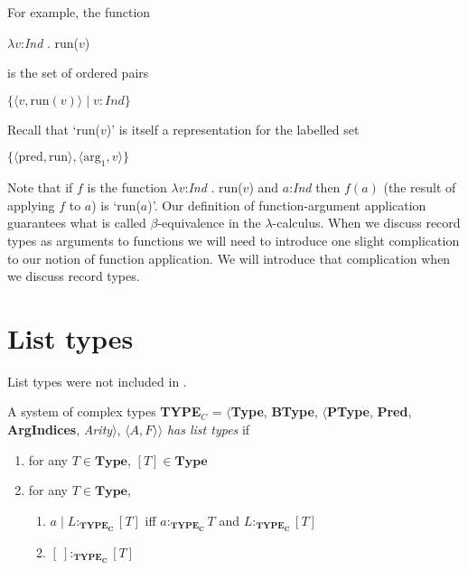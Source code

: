 For
example, the function

$\lambda v$:\textit{Ind} . run($v$)

is the set of ordered pairs

$\{\langle v,\mathrm{run}(v)\rangle\mid v:\mathit{Ind}\}$

Recall that `run($v$)' is itself a representation for the labelled
set

$\{\langle \mathrm{pred},\mathrm{run}\rangle, \langle
\mathrm{arg}_1,v\rangle\}$

Note that if $f$ is the function $\lambda v$:\textit{Ind} . run($v$)
and $a$:\textit{Ind} then $f(a)$ (the result of applying $f$ to $a$)
is `run($a$)'.  Our definition of function-argument application
guarantees what is called $\beta$-equivalence in the
$\lambda$-calculus.  When we discuss record types as arguments to
functions we will need to introduce one slight complication to our
notion of function application.  We will introduce that complication
when we discuss record types.


\section{List types}
\label{app:listtypes}

List types were not included in \cite{Cooper2012}.

A system of complex types {\bf TYPE$_C$} = $\langle${\bf Type}, {\bf BType},
$\langle$\textbf{PType}, {\bf Pred}, \textbf{ArgIndices}, {\it Arity\/}$\rangle$, $\langle A,F\rangle$$\rangle$ \textit{has list types} if
\begin{enumerate} 
 
\item for any $T \in \textbf{Type}$, $[T] \in \textbf{Type}$ 
 
\item for any $T \in \textbf{Type}$, 
\begin{enumerate} 
 
\item $a\mid L:_{\mathbf{TYPE_C}}[T]$ iff
  $a:_{\mathbf{TYPE_C}}T$ and $L:_{\mathbf{TYPE_C}}[T]$ 
 
\item $[\ ]:_{\mathbf{TYPE_C}}[T]$ 
 
\end{enumerate}

\end{enumerate}

